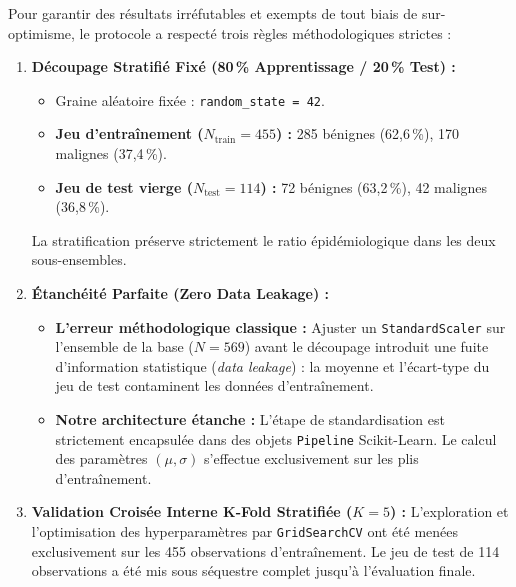 \documentclass[10pt,a4paper]{article}
\begin{document}
\noindent
Pour garantir des résultats irréfutables et exempts de tout biais de sur-optimisme, le protocole a respecté trois règles méthodologiques strictes :

\begin{enumerate}[leftmargin=0.6cm, itemsep=3pt]
	\item \textbf{Découpage Stratifié Fixé (80\,\% Apprentissage / 20\,\% Test) :}
	\begin{itemize}[itemsep=1pt]
		\item Graine aléatoire fixée : \texttt{random\_state = 42}.
		\item \textbf{Jeu d'entraînement ($N_{\text{train}} = 455$) :} 285 bénignes (62,6\,\%), 170 malignes (37,4\,\%).
		\item \textbf{Jeu de test vierge ($N_{\text{test}} = 114$) :} 72 bénignes (63,2\,\%), 42 malignes (36,8\,\%).
	\end{itemize}
	La stratification préserve strictement le ratio épidémiologique dans les deux sous-ensembles.
	
	\item \textbf{Étanchéité Parfaite (Zero Data Leakage) :}
	\begin{itemize}[itemsep=1pt]
		\item \textbf{L'erreur méthodologique classique :} Ajuster un \texttt{StandardScaler} sur l'ensemble de la base ($N=569$) avant le découpage introduit une fuite d'information statistique (\textit{data leakage}) : la moyenne et l'écart-type du jeu de test contaminent les données d'entraînement.
		\item \textbf{Notre architecture étanche :} L'étape de standardisation est strictement encapsulée dans des objets \texttt{Pipeline} Scikit-Learn. Le calcul des paramètres $(\mu, \sigma)$ s'effectue exclusivement sur les plis d'entraînement.
	\end{itemize}
	
	\item \textbf{Validation Croisée Interne K-Fold Stratifiée ($K=5$) :}
	L'exploration et l'optimisation des hyperparamètres par \texttt{GridSearchCV} ont été menées exclusivement sur les 455 observations d'entraînement. Le jeu de test de 114 observations a été mis sous séquestre complet jusqu'à l'évaluation finale.
\end{enumerate}

\end{document}
